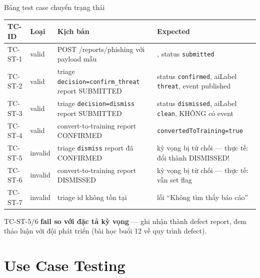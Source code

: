 \documentclass[aspectratio=169,12pt]{beamer}
\begin{document}
\begin{frame}[shrink=10]{Bảng test case chuyển trạng thái}
  \begin{center}
  \small
  \setlength{\tabcolsep}{4pt}
  \renewcommand{\arraystretch}{0.95}
  \begin{tabularx}{\textwidth}{l l >{\raggedright\arraybackslash}X >{\raggedright\arraybackslash}X}
    \toprule
    \textbf{TC-ID} & \textbf{Loại} & \textbf{Kịch bản} & \textbf{Expected} \\
    \midrule
    TC-ST-1 & valid & POST /reports/phishing với payload mẫu & 200, status \texttt{submitted} \\
    TC-ST-2 & valid & triage \texttt{decision=confirm\_threat} report SUBMITTED & status \texttt{confirmed}, aiLabel \texttt{threat}, event published \\
    TC-ST-3 & valid & triage \texttt{decision=dismiss} report SUBMITTED & status \texttt{dismissed}, aiLabel \texttt{clean}, KHÔNG có event \\
    TC-ST-4 & valid & convert-to-training report CONFIRMED & \texttt{convertedToTraining=true} \\
    TC-ST-5 & invalid & triage \texttt{dismiss} report đã CONFIRMED & kỳ vọng bị từ chối --- thực tế: đổi thành DISMISSED! \\
    TC-ST-6 & invalid & convert-to-training report DISMISSED & kỳ vọng bị từ chối --- thực tế: vẫn set flag \\
    TC-ST-7 & invalid & triage id không tồn tại & lỗi ``Không tìm thấy báo cáo'' \\
    \bottomrule
  \end{tabularx}
  \renewcommand{\arraystretch}{1}
  \end{center}

  \vspace{0.15em}
  {\small TC-ST-5/6 \textbf{fail so với đặc tả kỳ vọng} --- ghi nhận thành defect
  report, đem thảo luận với đội phát triển (bài học buổi 12 về quy trình defect).}
\end{frame}

\section{Use Case Testing}
\end{document}
